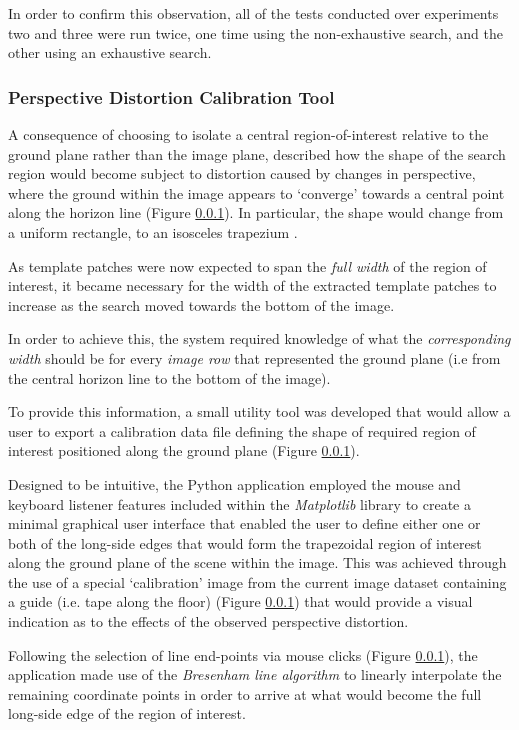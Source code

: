 In order to confirm this observation, all of the tests conducted over experiments two and three were run twice, one time using the non-exhaustive search, and the other using an exhaustive search.

\subsubsection{Perspective Distortion Calibration Tool}

A consequence of choosing to isolate a central region-of-interest relative to the ground plane rather than the image plane, described how the shape of the search region would become subject to distortion caused by changes in perspective, where the ground within the image appears to `converge' towards a central point along the horizon line (Figure \ref{}). In particular, the shape would change from a uniform rectangle, to an isosceles trapezium \cite{trapezium}.

As template patches were now expected to span the \textit{full width} of the region of interest, it became necessary for the width of the extracted template patches to increase as the search moved towards the bottom of the image. 

In order to achieve this, the system required knowledge of what the \textit{corresponding width} should be for every \textit{image row} that represented the ground plane (i.e from the central horizon line to the bottom of the image). 

To provide this information, a small utility tool was developed that would allow a user to export a calibration data file defining the shape of required region of interest positioned along the ground plane (Figure \ref{}). 

Designed to be intuitive, the Python application employed the mouse and keyboard listener features included within the \textit{Matplotlib} library \cite{matplotlib} to create a minimal graphical user interface that enabled the user to define either one or both of the long-side edges that would form the trapezoidal region of interest along the ground plane of the scene within the image. This was achieved through the use of a special `calibration' image from the current image dataset containing a guide (i.e. tape along the floor) (Figure \ref{}) that would provide a visual indication as to the effects of the observed perspective distortion. 

Following the selection of line end-points via mouse clicks (Figure \ref{}), the application made use of the \textit{Bresenham line algorithm} \cite{bresenham} to linearly interpolate the remaining coordinate points in order to arrive at what would become the full long-side edge of the region of interest. 

